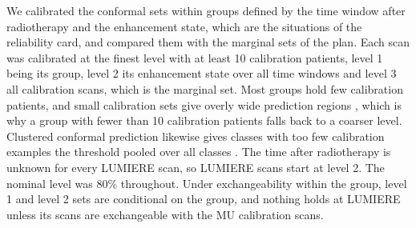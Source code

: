 \documentclass[11pt,a4paper]{article}
\begin{document}
We calibrated the conformal sets within groups defined by the time window after radiotherapy and the enhancement
state, which are the situations of the reliability card, and compared them with the marginal sets of the plan. Each scan was calibrated at the finest level with at least 10 calibration patients, level 1 being its group,
level 2 its enhancement state over all time windows and level 3 all calibration scans, which is the marginal set. Most
groups hold few calibration patients, and small calibration sets give overly wide prediction regions \citep{johansson2015}, which is
why a group with fewer than 10 calibration patients falls back to a coarser level. Clustered conformal prediction
likewise gives classes with too few calibration examples the threshold pooled over all classes \citep{ding2023}. The
time after radiotherapy is unknown for every LUMIERE scan, so LUMIERE scans start at level 2. The nominal level was
80\% throughout. Under exchangeability within the group, level 1 and level 2 sets are conditional on the group, and
nothing holds at LUMIERE unless its scans are exchangeable with the MU calibration scans.
\end{document}
